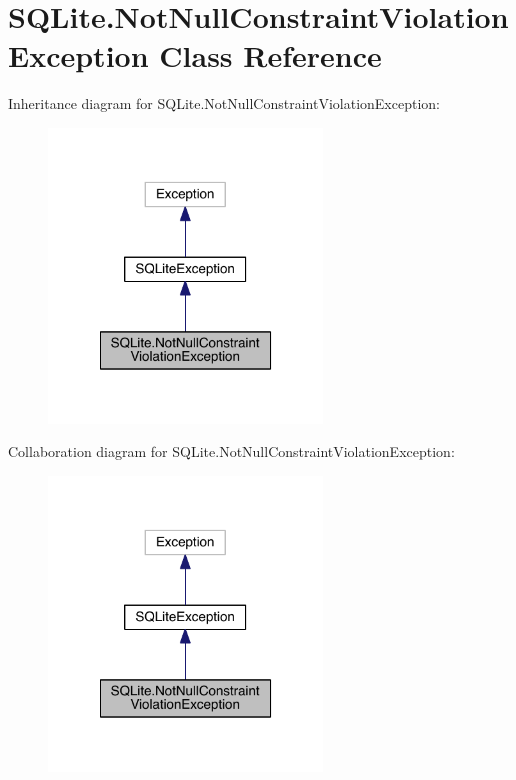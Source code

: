 \hypertarget{class_s_q_lite_1_1_not_null_constraint_violation_exception}{\section{S\+Q\+Lite.\+Not\+Null\+Constraint\+Violation\+Exception Class Reference}
\label{class_s_q_lite_1_1_not_null_constraint_violation_exception}
}


Inheritance diagram for S\+Q\+Lite.\+Not\+Null\+Constraint\+Violation\+Exception\+:
\nopagebreak
\begin{figure}[H]
\begin{center}
\leavevmode
\includegraphics[width=206pt]{class_s_q_lite_1_1_not_null_constraint_violation_exception__inherit__graph}
\end{center}
\end{figure}


Collaboration diagram for S\+Q\+Lite.\+Not\+Null\+Constraint\+Violation\+Exception\+:
\nopagebreak
\begin{figure}[H]
\begin{center}
\leavevmode
\includegraphics[width=206pt]{class_s_q_lite_1_1_not_null_constraint_violation_exception__coll__graph}
\end{center}
\end{figure}
